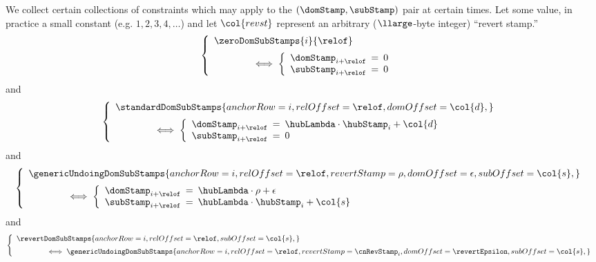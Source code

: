We collect certain collections of constraints which may apply to the $(\domStamp, \subStamp)$ pair at certain times. Let  some value, in practice a small constant (e.g. $1, 2, 3, 4, \dots$) and let $\col{revst}$ represent an arbitrary ($\llarge$-byte integer) ``revert stamp.''
\[
	\left\{ \begin{array}{l}
		\zeroDomSubStamps {i}{\relof}
		\vspace{2mm} \\ \qquad \qquad \iff
		\left\{\begin{array}{lcl}
			\domStamp_{i + \relof}		& \!\!\! = \!\!\! & 0 \\
			\subStamp_{i + \relof}		& \!\!\! = \!\!\! & 0 \\
		\end{array}\right.
	\end{array} \right.
\]
and
\[
	\left\{ \begin{array}{l}
		\standardDomSubStamps {
			anchorRow = i       ,
			relOffset = \relof  ,
			domOffset = \col{d} ,
		}
		\vspace{2mm} \\ \qquad \qquad \iff
		\left\{\begin{array}{lcl}
			\domStamp_{i + \relof}		& \!\!\! = \!\!\! & \hubLambda \cdot \hubStamp_{i} + \col{d} \\
			\subStamp_{i + \relof}		& \!\!\! = \!\!\! & 0 \\
		\end{array}\right.
	\end{array} \right.
\]
and
\[
	\left\{ \begin{array}{l}
		\genericUndoingDomSubStamps {
			anchorRow   = i        ,
			relOffset   = \relof   ,
			revertStamp = \rho     ,
			domOffset   = \epsilon ,
			subOffset   = \col{s}  ,
		}
		\vspace{2mm} \\ \qquad \qquad \iff
		\left\{\begin{array}{lcl}
			\domStamp_{i + \relof}		& \!\!\! = \!\!\! & \hubLambda \cdot \rho + \epsilon \\
			\subStamp_{i + \relof}		& \!\!\! = \!\!\! & \hubLambda \cdot \hubStamp_{i} + \col{s} \\
		\end{array}\right.
	\end{array} \right.
\]
and
\[
	\left\{ \begin{array}{l}
		\revertDomSubStamps {
			anchorRow = i       ,
			relOffset = \relof  ,
			subOffset = \col{s} ,
			}
		\vspace{2mm} \\ \qquad \qquad \iff
		\genericUndoingDomSubStamps {
			anchorRow   = i               ,
			relOffset   = \relof          ,
			revertStamp = \cnRevStamp_{i} ,
			domOffset   = \revertEpsilon  ,
			subOffset   = \col{s}         ,
		}
	\end{array} \right.
\]
